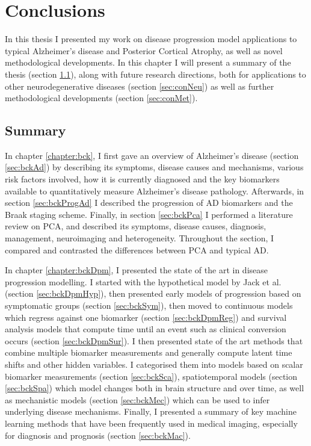 \chapter{Conclusions}
\label{chapter:conclusions}

In this thesis I presented my work on disease progression model applications to typical Alzheimer's disease and Posterior Cortical Atrophy, as well as novel methodological developments. In this chapter I will present a summary of the thesis (section \ref{sec:conSum}), along with future research directions, both for applications to other neurodegenerative diseases (section \ref{sec:conNeu}) as well as further methodological developments (section \ref{sec:conMet}). 

\section{Summary}
\label{sec:conSum}

In chapter \ref{chapter:bck}, I first gave an overview of Alzheimer's disease (section \ref{sec:bckAd}) by describing its symptoms, disease causes and mechanisms, various risk factors involved, how it is currently diagnosed and the key biomarkers available to quantitatively measure Alzheimer's disease pathology. Afterwards, in section \ref{sec:bckProgAd} I described the progression of AD biomarkers and the Braak staging scheme. Finally, in section \ref{sec:bckPca} I performed a literature review on PCA, and described its symptoms, disease causes, diagnosis, management, neuroimaging and heterogeneity. Throughout the section, I compared and contrasted the differences between PCA and typical AD.

In chapter \ref{chapter:bckDpm}, I presented the state of the art in disease progression modelling. I started with the hypothetical model by Jack et al. \cite{jack2010hypothetical} (section \ref{sec:bckDpmHyp}), then presented early models of progression based on symptomatic groups (section \ref{sec:bckSym}), then moved to continuous models which regress against one biomarker (section \ref{sec:bckDpmReg}) and survival analysis models that compute time until an event such as clinical conversion occurs (section \ref{sec:bckDpmSur}). I then presented state of the art methods that combine multiple biomarker measurements and generally compute latent time shifts and other hidden variables. I categorised them into models based on scalar biomarker measurements (section \ref{sec:bckSca}), spatiotemporal models (section \ref{sec:bckSpa}) which model changes both in brain structure and over time, as well as mechanistic models (section \ref{sec:bckMec}) which can be used to infer underlying disease mechanisms. Finally, I presented a summary of key machine learning methods that have been frequently used in medical imaging, especially for diagnosis and prognosis (section \ref{sec:bckMac}). 

